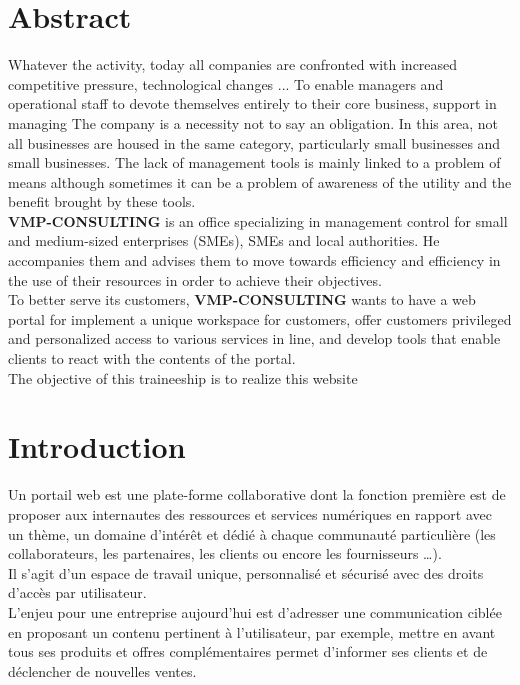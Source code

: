 \documentclass[12pt]{article}
\begin{document}
\section*{Abstract}
Whatever the activity, today all companies are confronted with increased competitive pressure, technological changes ... To enable managers and operational staff to devote themselves entirely to their core business, support in managing The company is a necessity not to say an obligation. In this area, not all businesses are housed in the same category, particularly small businesses and small businesses. The lack of management tools is mainly linked to a problem of means although sometimes it can be a problem of awareness of the utility and the benefit brought by these tools.\\
\textbf{VMP-CONSULTING}  is an office specializing in management control for small and medium-sized enterprises (SMEs), SMEs and local authorities. He accompanies them and advises them to move towards efficiency and efficiency in the use of their resources in order to achieve their objectives.\\
To better serve its customers, \textbf{VMP-CONSULTING}  wants to have a web portal for
implement a unique workspace for customers,
 offer customers privileged and personalized access to various services in
line, and
develop tools that enable clients to react with the contents of the
portal.\\
The objective of this traineeship is to realize this website

\newpage

\tableofcontents
\newpage



\section{Introduction}

Un portail web est une plate-forme collaborative dont la fonction première est de proposer aux internautes des ressources et services numériques en rapport avec un thème, un domaine d’intérêt et dédié à chaque communauté particulière (les collaborateurs, les partenaires, les clients ou encore les fournisseurs …).\\
Il s’agit d’un espace de travail unique, personnalisé et sécurisé avec des droits d’accès par utilisateur.\\
L’enjeu pour une entreprise aujourd'hui est d’adresser une communication ciblée en proposant un contenu pertinent à l’utilisateur, par exemple, mettre en avant tous ses produits et offres complémentaires permet d’informer ses clients et de déclencher de nouvelles ventes.\\ \\
\end{document}
